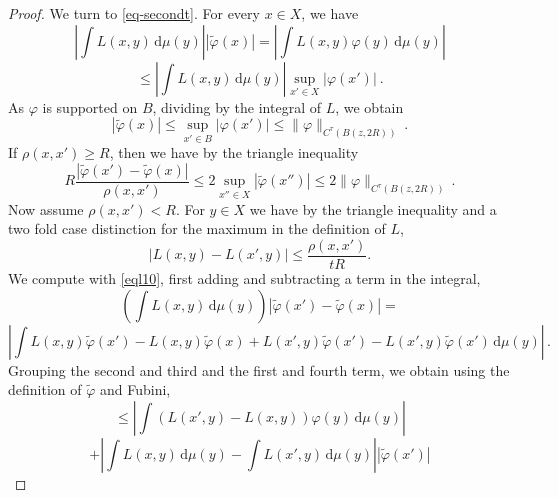 \documentclass[10pt,a4paper]{article}
\theoremstyle{plain}
\theoremstyle{definition}
\numberwithin{equation}{subsection}
\begin{document}
\begin{proof}
We turn to \eqref{eq-secondt}. For every $x\in X$, we have
\begin{equation}
    \left|\int L(x,y) \, \mathrm{d}\mu(y)\right||\tilde{\varphi}(x)|
    =\left|\int L(x,y) {\varphi}(y)\, \mathrm{d}\mu(y)\right|
\end{equation}
 \begin{equation}
    \le \left|\int L(x,y) \, \mathrm{d}\mu(y)\right| \sup_{x'\in X}
    |{\varphi}(x')|\ .
\end{equation}
As $\varphi$ is supported on $B$, dividing by the integral of $L$, we obtain
\begin{equation}\label{eql42}
 |\tilde{\varphi}(x)|\le \sup_{x'\in B}
    |{\varphi}(x')|\le \|\varphi\|_{C^\tau(B(z, 2R))}\ .
\end{equation}
If $\rho(x,x')\ge R$, then we have by the triangle inequality
  \begin{equation}\label{eql52}
 R\frac{|\tilde{\varphi}(x') - \tilde \varphi(x)|}{\rho(x,x')} \le
 2\sup_{x''\in X} |\tilde{\varphi}(x'')|\le 2\|\varphi\|_{C^\tau(B(z, 2R))}\, .
\end{equation}
Now assume $\rho(x,x')< R$. For $y\in X$ we have by the triangle inequality and a two fold case distinction
for the maximum in the definition of $L$,
\begin{equation}\label{eql10}
   |L(x,y) - L(x',y)| \le \frac{\rho(x,x')}{tR}.
\end{equation}
We compute with \eqref{eql10}, first adding and subtracting a term in the integral,
\begin{equation}
    \left(\int L(x,y) \, \mathrm{d}\mu(y)\right)
    |\tilde{\varphi}(x') - \tilde \varphi(x)|=
\end{equation}
\begin{equation}
    \left|\int L(x,y) \tilde{\varphi}(x')
    -L(x,y) \tilde{\varphi}(x)
    +L(x',y) \tilde{\varphi}(x')-
     L(x',y) \tilde{\varphi}(x')
    \, \mathrm{d}\mu(y)\right|\,.
\end{equation}
Grouping the second and third and the first and fourth term, we obtain using the definition of $\tilde \varphi$ and Fubini,
\begin{equation}\label{eql21}
    \le \left| \int (L(x',y)-L(x,y)) \varphi(y) \, \mathrm{d}\mu(y)\right|
\end{equation}
\begin{equation}\label{eql22}
    + \left| \int L(x,y) \, \mathrm{d}\mu(y)-\int L(x',y) \, \mathrm{d}\mu(y)\right||\tilde{\varphi}(x')|
\end{equation}
\begin{equation}\label{eql23}

\end{equation}
\end{proof}
\end{document}
